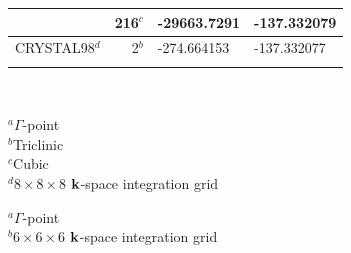 \commentoutA{\documentclass[prb,aps,nobibnotes,twocolumn,doublespace,twocolumngrid,superbib,showpacs]{revtex4}}
\begin{document}
{\begin{table}[ht]
{\begin{tabular}{lrll}
                     & 216$^c$  & -29663.7291     & -137.332079  \\ 
\hline
{\sc CRYSTAL98}$^d$  & 2$^b$    & -274.664153     & -137.332077  \\ 
\botrule 
\end{tabular}\\}
\raggedright{
{\hskip 0.18in}$^a \Gamma$-point\\
{\hskip 0.18in}$^b$Triclinic \\
{\hskip 0.18in}$^c$Cubic \\
{\hskip 0.18in}$^d 8\times8\times8$ ${\bf k}$-space integration grid  \\}
\end{table}

\begin{table}[h]
\caption{Progression of $\Gamma$-point super-cell calculations of proton ordered ice
at the RHF-MIC/8-51G/5-11G$^*$ level of theory.   Comparison is made to a final value 
approaching the ${\bf k}$-space integration limit for the primitive cell.}
\label{PIceTable}
\raggedright{
{\hskip 0.01in}$^a \Gamma$-point\\
{\hskip 0.01in}$^b 6\times6\times6$ ${\bf k}$-space integration grid \\}
\end{table}

}
\end{document}

